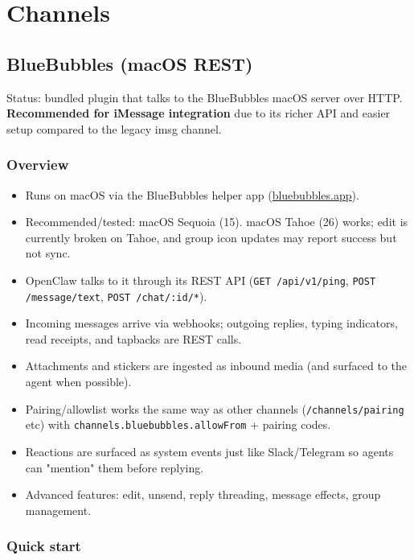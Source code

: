 \chapter{Channels}

\section{BlueBubbles (macOS REST)}


Status: bundled plugin that talks to the BlueBubbles macOS server over HTTP. \textbf{Recommended for iMessage integration} due to its richer API and easier setup compared to the legacy imsg channel.

\subsection{Overview}


\begin{itemize}
  \item Runs on macOS via the BlueBubbles helper app (\href{https://bluebubbles.app}{bluebubbles.app}).
  \item Recommended/tested: macOS Sequoia (15). macOS Tahoe (26) works; edit is currently broken on Tahoe, and group icon updates may report success but not sync.
  \item OpenClaw talks to it through its REST API (\texttt{GET /api/v1/ping}, \texttt{POST /message/text}, \texttt{POST /chat/:id/*}).
  \item Incoming messages arrive via webhooks; outgoing replies, typing indicators, read receipts, and tapbacks are REST calls.
  \item Attachments and stickers are ingested as inbound media (and surfaced to the agent when possible).
  \item Pairing/allowlist works the same way as other channels (\texttt{/channels/pairing} etc) with \texttt{channels.bluebubbles.allowFrom} + pairing codes.
  \item Reactions are surfaced as system events just like Slack/Telegram so agents can "mention" them before replying.
  \item Advanced features: edit, unsend, reply threading, message effects, group management.
\end{itemize}


\subsection{Quick start}



